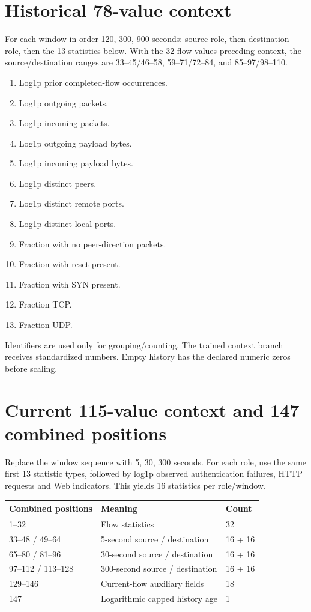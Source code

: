 \documentclass[11pt,a4paper,oneside]{report}
\begin{document}
\section{Historical 78-value context}
For each window in order 120, 300, 900 seconds: source role, then destination role, then the 13 statistics below. With the 32 flow values preceding context, the source/destination ranges are 33--45/46--58, 59--71/72--84, and 85--97/98--110.
\begin{enumerate}
\item Log1p prior completed-flow occurrences.
\item Log1p outgoing packets.
\item Log1p incoming packets.
\item Log1p outgoing payload bytes.
\item Log1p incoming payload bytes.
\item Log1p distinct peers.
\item Log1p distinct remote ports.
\item Log1p distinct local ports.
\item Fraction with no peer-direction packets.
\item Fraction with reset present.
\item Fraction with SYN present.
\item Fraction TCP.
\item Fraction UDP.
\end{enumerate}
Identifiers are used only for grouping/counting. The trained context branch receives standardized numbers. Empty history has the declared numeric zeros before scaling.

\section{Current 115-value context and 147 combined positions}
Replace the window sequence with 5, 30, 300 seconds. For each role, use the same first 13 statistic types, followed by log1p observed authentication failures, HTTP requests and Web indicators. This yields 16 statistics per role/window.
\begin{center}\begin{tabular}{lll}\toprule Combined positions & Meaning & Count\\\midrule
1--32 & Flow statistics & 32\\
33--48 / 49--64 & 5-second source / destination & 16 + 16\\
65--80 / 81--96 & 30-second source / destination & 16 + 16\\
97--112 / 113--128 & 300-second source / destination & 16 + 16\\
129--146 & Current-flow auxiliary fields & 18\\
147 & Logarithmic capped history age & 1\\\bottomrule\end{tabular}\end{center}
\end{document}
